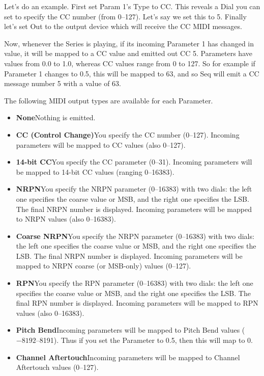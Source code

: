 \documentclass[twoside,10pt]{article}
\begin{document}
Let's do an example.  First set Param 1's Type to CC.  This reveals a Dial you can set to specify the CC number (from 0--127).  Let's say we set this to 5.  Finally let's set Out to the output device which will receive the CC MIDI messages.

Now, whenever the Series is playing, if its incoming Parameter 1 has changed in value, it will be mapped to a CC value and emitted out CC 5.  Parameters have values from 0.0 to 1.0, whereas CC values range from 0 to 127.  So for example if Parameter 1 changes to 0.5, this will be mapped to 63, and so Seq will emit a CC message number 5 with a value of 63.

The following MIDI output types are available for each Parameter.

\begin{itemize} 
\item {\bf None}\quad Nothing is emitted.
\item {\bf CC (Control Change)}\quad You specify the CC number (0--127).  Incoming parameters will be mapped to CC values (also 0--127).
\item {\bf 14-bit CC}\quad You specify the CC parameter (0--31).  Incoming parameters will be mapped to 14-bit CC values (ranging 0--16383).
\item {\bf NRPN}\quad You specify the NRPN parameter (0--16383) with two dials: the left one specifies the coarse value or MSB, and the right one specifies the LSB.  The final NRPN number is displayed.  Incoming parameters will be mapped to NRPN values (also 0--16383).
\item {\bf Coarse NRPN}\quad You specify the NRPN parameter (0--16383) with two dials: the left one specifies the coarse value or MSB, and the right one specifies the LSB.  The final NRPN number is displayed.  Incoming parameters will be mapped to NRPN coarse (or MSB-only) values (0--127).
\item {\bf RPN}\quad You specify the RPN parameter (0--16383) with two dials: the left one specifies the coarse value or MSB, and the right one specifies the LSB.  The final RPN number is displayed.  Incoming parameters will be mapped to RPN values (also 0--16383).
\item {\bf Pitch Bend}\quad Incoming parameters will be mapped to Pitch Bend values (\(-8192\)--8191).  Thus if you set the Parameter to 0.5, then this will map to 0.
\item {\bf Channel Aftertouch}\quad Incoming parameters will be mapped to Channel Aftertouch values (0--127).
\end{itemize}
\end{document}
